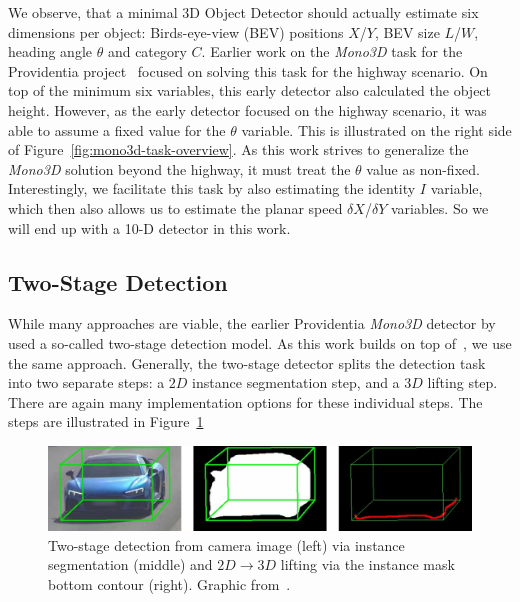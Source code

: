 We observe, that a minimal 3D Object Detector should actually estimate six dimensions per object: Birds-eye-view (BEV) positions $X$/$Y$, BEV size $L$/$W$, heading angle $\theta$ and category $C$.
Earlier work on the \textit{Mono3D} task for the Providentia project~\cite{leonthesis} focused on solving this task for the highway scenario.
On top of the minimum six variables, this early detector also calculated the object height.
However, as the early detector focused on the highway scenario, it was able to assume a fixed value for the $\theta$ variable.
This is illustrated on the right side of Figure~\ref{fig:mono3d-task-overview}.
As this work strives to generalize the \textit{Mono3D} solution beyond the highway, it must treat the $\theta$ value as non-fixed.
Interestingly, we facilitate this task by also estimating the identity $I$ variable, which then also allows us to estimate the planar speed $\delta X$/$\delta Y$ variables.
So we will end up with a 10-D detector in this work.

\subsection{Two-Stage Detection}
\label{subsec:twostage}

While many approaches are viable, the earlier Providentia \textit{Mono3D} detector by~\cite{leonthesis} used a so-called two-stage detection model.
As this work builds on top of~\cite{leonthesis}, we use the same approach.
Generally, the two-stage detector splits the detection task into two separate steps: a $2D$ instance segmentation step, and a $3D$ lifting step.
There are again many implementation options for these individual steps.
The steps are illustrated in Figure~\ref{fig:mono3d-two-stage}

\begin{figure}[htb]
    \includegraphics[width=\linewidth]{figures/two-stage-detection}
    \caption{Two-stage detection from camera image (left) via instance segmentation (middle) and $2D \rightarrow 3D$ lifting via the instance mask bottom contour (right). Graphic from~\cite{leonthesis}.}
    \label{fig:mono3d-two-stage}
\end{figure}

